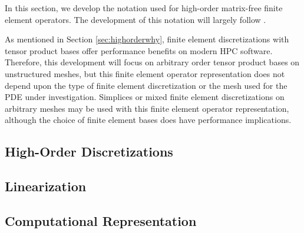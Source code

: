 In this section, we develop the notation used for high-order matrix-free finite element operators.
The development of this notation will largely follow \cite{brown2010efficient}.

As mentioned in Section \ref{sec:highorderwhy}, finite element discretizations with tensor product bases offer performance benefits on modern HPC software.
Therefore, this development will focus on arbitrary order tensor product bases on unstructured meshes, but this finite element operator representation does not depend upon the type of finite element discretization or the mesh used for the PDE under investigation.
Simplices or mixed finite element discretizations on arbitrary meshes may be used with this finite element operator representation, although the choice of finite element bases does have performance implications.

\subsection{High-Order Discretizations} \label{sec:highorderdiscretizations}


\subsection{Linearization}


\subsection{Computational Representation}

